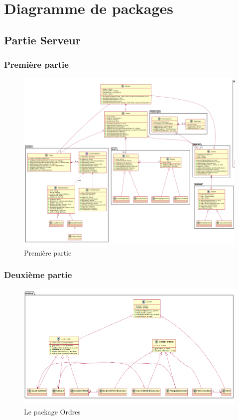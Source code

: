 \section{Diagramme de packages}
	\subsection{Partie Serveur}
		\subsubsection{Première partie}
			\vspace{10mm}
			\begin{figure}[!h]
				\centering
				\includegraphics[angle=90,width=150mm]{images/DP1.png}
				\caption{Première partie}
			\end{figure}

		\newpage

		\subsubsection{Deuxième partie}
			\vspace{10mm}
			\begin{figure}[!h]
				\centering
				\includegraphics[scale=0.4]{images/DP2.png}
				\caption{Le package Ordres}
			\end{figure}

